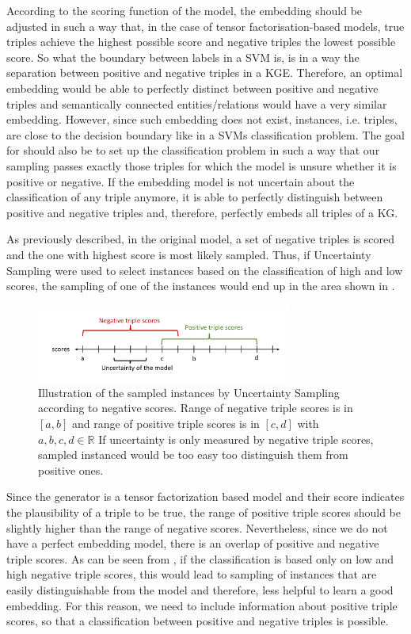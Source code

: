 According to the scoring function of the model, the embedding should be adjusted in such a way that, in the case of tensor factorisation-based models, true triples achieve the highest possible score and negative triples the lowest possible score.
So what the boundary between labels in a \ac{SVM} is, is in a way the separation between positive and negative triples in a \ac{KGE}.
Therefore, an optimal embedding would be able to perfectly distinct between positive and negative triples and semantically connected entities/relations would have a very similar embedding.
However, since such embedding does not exist, instances, i.e. triples, are close to the decision boundary like in a \acp{SVM} classification problem.
The goal for \ucgan should also be to set up the classification problem in such a way that our sampling passes  exactly those triples for which the model is unsure whether it is positive or negative.
If the embedding model is not uncertain about the classification of any triple anymore, it is able to perfectly distinguish between positive and negative triples and, therefore, perfectly embeds all triples of a \ac{KG}.

As previously described, in the original \kbgan model, a set of negative triples is scored and the one with highest score is most likely sampled.
Thus, if Uncertainty Sampling were used to select instances based on the classification of high and low scores, the sampling of one of the instances would end up in the area shown in .
\begin{figure}[t]
  \centering
    \includegraphics[width=0.75\textwidth]{figures/badVsGoodApproach.pdf}
  \caption{Illustration of the sampled instances by Uncertainty Sampling according to negative scores.
  Range of negative triple scores is in $[a, b]$ and range of positive triple scores is in  $[c, d]$ with $a,b,c,d \in \mathbb{R}$
  If uncertainty is only measured by negative triple scores, sampled instanced would be too easy too distinguish them from positive ones.}
  \label{fig:badVsGoodApproach}
\end{figure}
Since the generator is a tensor factorization based model and their score indicates the plausibility of a triple to be true, the range of positive triple scores should be slightly higher than the range of negative scores.
Nevertheless, since we do not have a perfect embedding model, there is an overlap of positive and negative triple scores.
As can be seen from , if the classification is based only on low and high negative triple scores, this would lead to sampling of instances that are easily distinguishable from the model and therefore, less helpful to learn a good embedding.
For this reason, we need to include information about positive triple scores, so that a classification between positive and negative triples is possible.


